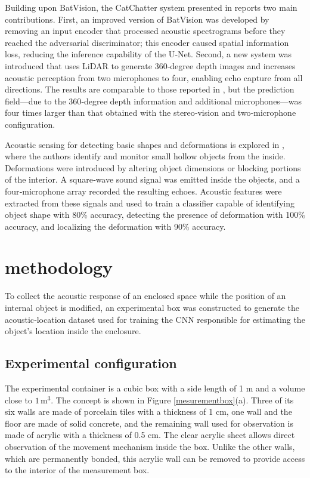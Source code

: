 \documentclass[conference]{IEEEtran}
\begin{document}
Building upon BatVision, the CatChatter system presented in \cite{cat1} reports two main contributions. First, an improved version of BatVision was developed by removing an input encoder that processed acoustic spectrograms before they reached the adversarial discriminator; this encoder caused spatial information loss, reducing the inference capability of the U‑Net. Second, a new system was introduced that uses LiDAR to generate 360‑degree depth images and increases acoustic perception from two microphones to four, enabling echo capture from all directions. The results are comparable to those reported in \cite{bat1}, but the prediction field—due to the 360‑degree depth information and additional microphones—was four times larger than that obtained with the stereo‑vision and two‑microphone configuration.

Acoustic sensing for detecting basic shapes and deformations is explored in \cite{echosense}, where the authors identify and monitor small hollow objects from the inside. Deformations were introduced by altering object dimensions or blocking portions of the interior. A square‑wave sound signal was emitted inside the objects, and a four‑microphone array recorded the resulting echoes. Acoustic features were extracted from these signals and used to train a classifier capable of identifying object shape with 80\% accuracy, detecting the presence of deformation with 100\% accuracy, and localizing the deformation with 90\% accuracy.    


\section{methodology}

To collect the acoustic response of an enclosed space while the position of an internal object is modified, an experimental box was constructed to generate the acoustic‑location dataset used for training the CNN responsible for estimating the object’s location inside the enclosure.

\subsection{Experimental configuration}

The experimental container is a cubic box with a side length of 1 m and a volume close to $1\,\mathrm{m}^3$. The concept is shown in Figure \ref{mesurementbox}(a). Three of its six walls are made of porcelain tiles with a thickness of 1 cm, one wall and the floor are made of solid concrete, and the remaining wall used for observation is made of acrylic with a thickness of 0.5 cm. The clear acrylic sheet allows direct observation of the movement mechanism inside the box. Unlike the other walls, which are permanently bonded, this acrylic wall can be removed to provide access to the interior of the measurement box.
\end{document}
